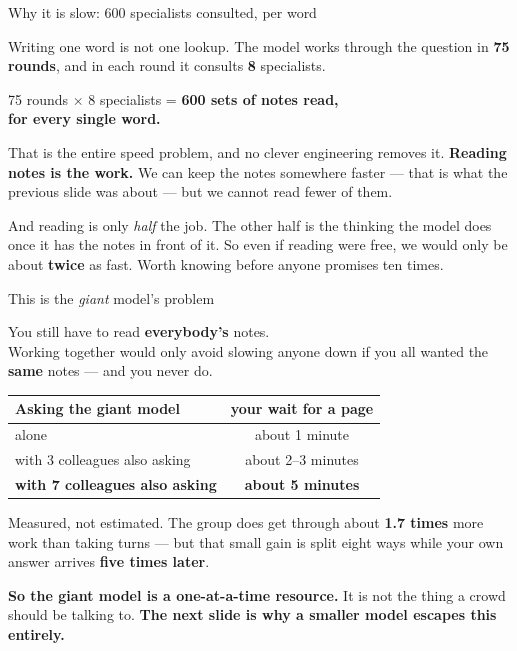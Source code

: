 \documentclass[aspectratio=169]{beamer}
\newcommand{\keybox}[1]{%
  \begin{center}
  \colorbox{black!8}{\parbox{0.92\textwidth}{\centering #1}}
  \end{center}}
\newcommand{\goodbox}[1]{%
  \begin{center}
  \colorbox{green!12}{\parbox{0.92\textwidth}{\centering #1}}
  \end{center}}
\begin{document}
\begin{frame}{Why it is slow: 600 specialists consulted, per word}

Writing one word is not one lookup. The model works through the question in \textbf{75 rounds}, and
in each round it consults \textbf{8} specialists.

\vspace{0.6em}
\keybox{\Large 75 rounds $\times$ 8 specialists = \textbf{600 sets of notes read,\\for every single
word.}}

\vspace{0.8em}
That is the entire speed problem, and no clever engineering removes it. \textbf{Reading notes is the
work.} We can keep the notes somewhere faster --- that is what the previous slide was about --- but
we cannot read fewer of them.

\vspace{0.7em}
{\small And reading is only \emph{half} the job. The other half is the thinking the model does once
it has the notes in front of it. So even if reading were free, we would only be about \textbf{twice}
as fast. Worth knowing before anyone promises ten times.}

\end{frame}

\begin{frame}{This is the \emph{giant} model's problem}

\keybox{\large You still have to read \textbf{everybody's} notes.\\[0.3em]
Working together would only avoid slowing anyone down if you all wanted the \textbf{same} notes ---
and you never do.}

\vspace{0.5em}
\begin{center}
\small
\renewcommand{\arraystretch}{1.25}
\begin{tabular}{@{}lc@{}}
\toprule
\textbf{Asking the giant model} & \textbf{your wait for a page} \\
\midrule
alone & about 1 minute \\
with 3 colleagues also asking & about 2--3 minutes \\
\textbf{with 7 colleagues also asking} & \textbf{about 5 minutes} \\
\bottomrule
\end{tabular}
\end{center}

\vspace{0.5em}
{\small Measured, not estimated. The group does get through about \textbf{1.7 times} more work than
taking turns --- but that small gain is split eight ways while your own answer arrives \textbf{five
times later}.}

\vspace{0.4em}
\goodbox{\textbf{So the giant model is a one-at-a-time resource.} It is not the thing a crowd
should be talking to. \textbf{The next slide is why a smaller model escapes this entirely.}}

\end{frame}
\end{document}

